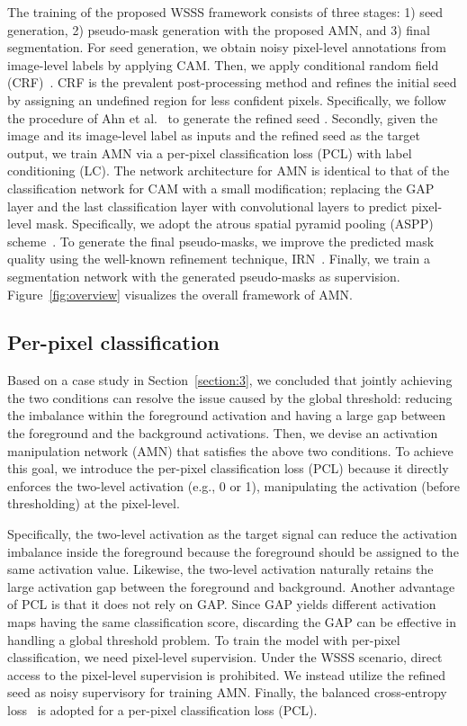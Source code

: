 \documentclass[10pt,twocolumn,letterpaper]{article}
\begin{document}
The training of the proposed WSSS framework consists of three stages: 1) seed generation, 2) pseudo-mask generation with the proposed AMN, and 3) final segmentation. For seed generation, we obtain noisy pixel-level annotations from image-level labels by applying CAM. Then, we apply conditional random field (CRF)~\cite{krahenbuhl2011efficient}. CRF is the prevalent post-processing method and refines the initial seed by assigning an undefined region for less confident pixels. Specifically, we follow the procedure of Ahn et al.~\cite{ahn2019weakly} to generate the refined seed . Secondly, given the image  and its image-level label  as inputs and the refined seed  as the target output, we train AMN via a per-pixel classification loss (PCL) with label conditioning (LC). The network architecture for AMN is identical to that of the classification network for CAM with a small modification; replacing the GAP layer and the last classification layer with convolutional layers to predict pixel-level mask. Specifically, we adopt the atrous spatial pyramid pooling (ASPP) scheme~\cite{chen2017deeplab}. To generate the final pseudo-masks, we improve the predicted mask quality using the well-known refinement technique, IRN~\cite{ahn2019weakly}. Finally, we train a segmentation network with the generated pseudo-masks as supervision. Figure~\ref{fig:overview} visualizes the overall framework of AMN.

\subsection{Per-pixel classification}\label{subsection:4.2}

Based on a case study in Section~\ref{section:3}, we concluded that jointly achieving the two conditions can resolve the issue caused by the global threshold: reducing the imbalance within the foreground activation and having a large gap between the foreground and the background activations. Then, we devise an activation manipulation network (AMN) that satisfies the above two conditions. To achieve this goal, we introduce the per-pixel classification loss (PCL) because it directly enforces the two-level activation (e.g., 0 or 1), manipulating the activation (before thresholding) at the pixel-level. 

Specifically, the two-level activation as the target signal can reduce the activation imbalance inside the foreground because the foreground should be assigned to the same activation value. Likewise, the two-level activation naturally retains the large activation gap between the foreground and background. Another advantage of PCL is that it does not rely on GAP. Since GAP yields different activation maps having the same classification score, discarding the GAP can be effective in handling a global threshold problem. To train the model with per-pixel classification, we need pixel-level supervision. Under the WSSS scenario, direct access to the pixel-level supervision is prohibited. We instead utilize the refined seed  as noisy supervisory for training AMN. Finally, the balanced cross-entropy loss~\cite{huang2018weakly} is adopted for a per-pixel classification loss (PCL).
\end{document}
